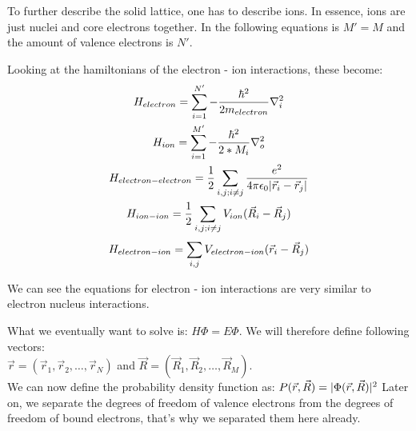 
To further describe the solid lattice, one has to describe ions. In essence, ions are just nuclei and core electrons together. In the following equations is $ M' = M $ and the amount of valence electrons is $ N' $.\\ \par
Looking at the hamiltonians of the electron - ion interactions, these become:
\begin{gather}
	H_{electron} = \sum_{i = 1}^{N'}{-\frac{\hbar^2}{2m_{electron}} \nabla_i^2}\\
	H_{ion} = \sum_{i = 1}^{M'}{-\frac{\hbar^2}{2*M_i} \nabla_o^2}\\
	H_{electron - electron} = \frac{1}{2} \sum_{i, j; i \neq j}^{}{\frac{e^2}{4 \pi \epsilon_0 \lvert\vec{r}_i - \vec{r}_j\rvert}}\\
	H_{ion - ion} = \frac{1}{2} \sum_{i, j; i \neq j}^{}{V_{ion}(\vec{R}_i - \vec{R}_j)}\\
	H_{electron - ion} = \sum_{i, j}^{}{V_{electron - ion}(\vec{r}_i - \vec{R}_j)}
\end{gather} \par
We can see the equations for electron - ion interactions are very similar to electron nucleus interactions. \\ \par

What we eventually want to solve is: $ H\Phi = E\Phi $. We will therefore define following vectors: \\$\vec{r} = (\vec{r}_1, \vec{r}_2, \dots, \vec{r}_N)$ and $\vec{R} = (\vec{R}_1, \vec{R}_2, \dots, \vec{R}_M)$. \\
We can now define the probability density function as: $P (\vec{r}, \vec{R}) = \lvert\Phi(\vec{r}, \vec{R})\rvert^2$
Later on, we separate the degrees of freedom of valence electrons from the degrees of freedom of bound electrons, that's why we separated them here already.


